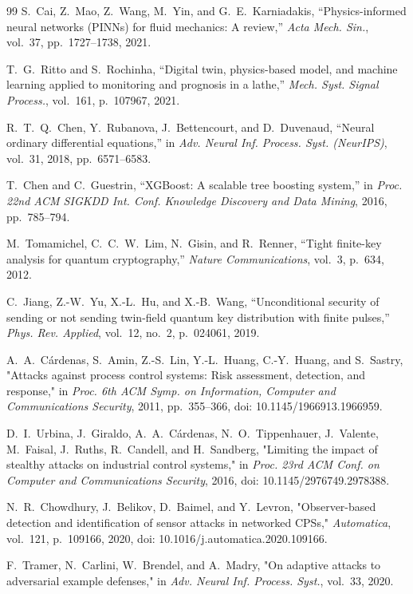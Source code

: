 \documentclass[journal,twocolumn]{IEEEtran}
\begin{document}
\begin{thebibliography}{99}
S.~Cai, Z.~Mao, Z.~Wang, M.~Yin, and G.~E.~Karniadakis,
``Physics-informed neural networks (PINNs) for fluid mechanics: A review,''
\emph{Acta Mech. Sin.}, vol.~37, pp.~1727--1738, 2021.

T.~G.~Ritto and S.~Rochinha,
``Digital twin, physics-based model, and machine learning applied to monitoring
and prognosis in a lathe,''
\emph{Mech. Syst. Signal Process.}, vol.~161, p.~107967, 2021.

R.~T.~Q.~Chen, Y.~Rubanova, J.~Bettencourt, and D.~Duvenaud,
``Neural ordinary differential equations,''
in \emph{Adv. Neural Inf. Process. Syst. (NeurIPS)}, vol.~31, 2018,
pp.~6571--6583.

T.~Chen and C.~Guestrin,
``XGBoost: A scalable tree boosting system,''
in \emph{Proc. 22nd ACM SIGKDD Int. Conf. Knowledge Discovery and Data Mining},
2016, pp.~785--794.

M.~Tomamichel, C.~C.~W.~Lim, N.~Gisin, and R.~Renner,
``Tight finite-key analysis for quantum cryptography,''
\emph{Nature Communications}, vol.~3, p.~634, 2012.

C.~Jiang, Z.-W.~Yu, X.-L.~Hu, and X.-B.~Wang,
``Unconditional security of sending or not sending twin-field quantum key distribution
with finite pulses,''
\emph{Phys. Rev. Applied}, vol.~12, no.~2, p.~024061, 2019.

A.~A.~C\'ardenas, S.~Amin, Z.-S.~Lin, Y.-L.~Huang, C.-Y.~Huang, and S.~Sastry,
"Attacks against process control systems: Risk assessment, detection, and response,"
in \emph{Proc. 6th ACM Symp. on Information, Computer and Communications Security},
2011, pp.~355--366, doi: 10.1145/1966913.1966959.

D.~I.~Urbina, J.~Giraldo, A.~A.~C\'ardenas, N.~O.~Tippenhauer, J.~Valente,
M.~Faisal, J.~Ruths, R.~Candell, and H.~Sandberg,
"Limiting the impact of stealthy attacks on industrial control systems,"
in \emph{Proc. 23rd ACM Conf. on Computer and Communications Security},
2016, doi: 10.1145/2976749.2978388.

N.~R.~Chowdhury, J.~Belikov, D.~Baimel, and Y.~Levron,
"Observer-based detection and identification of sensor attacks in networked CPSs,"
\emph{Automatica}, vol.~121, p.~109166, 2020,
doi: 10.1016/j.automatica.2020.109166.

F.~Tramer, N.~Carlini, W.~Brendel, and A.~Madry,
"On adaptive attacks to adversarial example defenses,"
in \emph{Adv. Neural Inf. Process. Syst.}, vol.~33, 2020.

\end{thebibliography}
\end{document}
